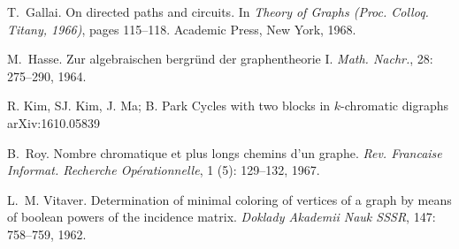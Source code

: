 \documentclass{endm}
\begin{document}
\begin{thebibliography}{10}
T.~Gallai.
\newblock On directed paths and circuits.
\newblock In \emph{Theory of Graphs (Proc. Colloq. Titany, 1966)}, pages
  115--118. Academic Press, New York, 1968.



M.~Hasse.
\newblock Zur algebraischen bergr\"und der graphentheorie {I}.
\newblock \emph{Math. Nachr.}, 28: 275--290, 1964.


R. Kim, SJ. Kim, J. Ma; B. Park
\newblock Cycles with two blocks in $k$-chromatic digraphs
\newblock arXiv:1610.05839



B.~Roy.
\newblock Nombre chromatique et plus longs chemins d'un graphe.
\newblock \emph{Rev. Francaise Informat. Recherche Op\'erationnelle},
  1 (5): 129--132, 1967.



L.~M. Vitaver.
\newblock Determination of minimal coloring of vertices of a graph by means of
  boolean powers of the incidence matrix.
\newblock \emph{Doklady Akademii Nauk SSSR}, 147: 758--759, 1962.




\end{thebibliography}
\end{document}
